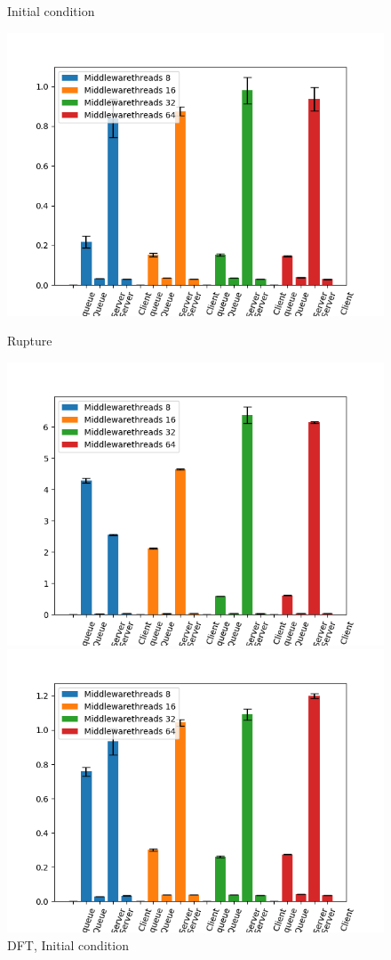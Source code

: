 \documentclass[11pt,a4paper]{article}
\begin{document}
\begin{figure}[!ht]
\begin{minipage}[b]{0.5\linewidth}
    \caption{Initial condition} 
    \vspace{4ex}
  \end{minipage}%
  \begin{minipage}[b]{0.5\linewidth}
    \centering
    \includegraphics[width=0.7\linewidth]{img/exp3_1/exp3_1_mw_percentile_plots_writes_1__vc_2.png} 
    \caption{Rupture} 
    \vspace{4ex}
  \end{minipage} 
  \begin{minipage}[b]{0.5\linewidth}
    \centering
    \includegraphics[width=0.7\linewidth]{img/exp3_1/exp3_1_mw_percentile_plots_writes_0__vc_4.png} 
    \caption{DFT, Initial condition} 
    \vspace{4ex}
  \end{minipage}%
  \begin{minipage}[b]{0.5\linewidth}
    \centering
    \includegraphics[width=0.7\linewidth]{img/exp3_1/exp3_1_mw_percentile_plots_writes_1__vc_4.png} 

\end{minipage}
\end{figure}
\end{document}
